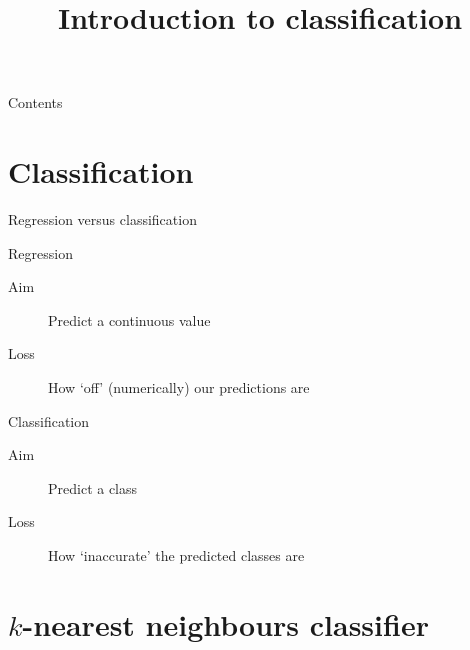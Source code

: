 

\title{Introduction to classification}



\maketitle

\begin{frame}{Contents}
    \tableofcontents[hideallsubsections]
\end{frame}

\section{Classification}

\begin{frame}{Regression versus classification}
    \begin{block}{Regression}
        \begin{description}
            \item[Aim]  Predict a \alert{continuous} value
            \item[Loss] How `off' (numerically) our predictions are
        \end{description}
    \end{block}
    \vfill
    \begin{block}{Classification}
        \begin{description}
            \item[Aim]  Predict a \alert{class}
            \item[Loss] How `inaccurate' the predicted classes are
        \end{description}
    \end{block}
\end{frame}

\section{$k$-nearest neighbours classifier}

